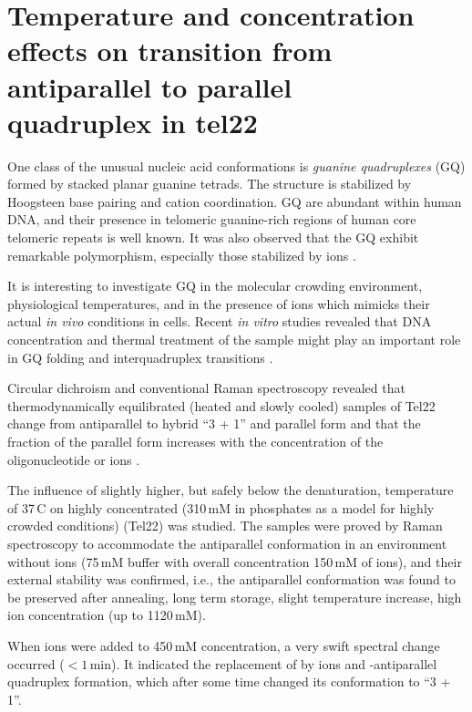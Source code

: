 \section[%
	Temperature and concentration effects on transition from antiparallel	to
	parallel quadruplex in tel22
]{%
	Temperature and concentration effects on transition from antiparallel to
	parallel\\quadruplex in tel22
}

One class of the unusual nucleic acid conformations is
\emph{guanine quadruplexes} (GQ)
formed by stacked planar guanine tetrads.
The structure is stabilized by Hoogsteen base pairing and cation coordination.
GQ are abundant within human DNA, and their presence in telomeric guanine-rich
regions of human core telomeric repeats  is well known.
It was also observed that the GQ exhibit remarkable polymorphism, especially
those stabilized by  ions
\parencite{Chaires2013}.

It is interesting to investigate GQ in the molecular crowding environment,
physiological temperatures, and in the presence of  ions which mimicks
their actual \emph{in vivo} conditions in cells.
Recent \emph{in vitro} studies revealed that DNA concentration and thermal
treatment
of the sample might play an important role in GQ folding and interquadruplex
transitions
\parencite{Palacky2013}.

Circular dichroism and conventional Raman spectroscopy revealed that
thermodynamically equilibrated (heated and slowly cooled) samples of Tel22
change from antiparallel to hybrid “3 + 1” and parallel form and that
the fraction of the parallel form increases with the concentration of the
oligonucleotide or  ions
\parencite{Palacky2013}.

The influence of slightly higher, but safely below the denaturation,
temperature of 37\,\textdegree{}C on highly concentrated (310\,mM
in phosphates as a model for highly crowded conditions) 
(Tel22) was studied.
The samples were proved by Raman spectroscopy to accommodate the antiparallel
conformation in an environment without  ions (75\,mM 
buffer with overall concentration 150\,mM of  ions), and their
external
stability was confirmed, i.e., the antiparallel conformation was found to be
preserved after annealing, long term storage, slight temperature increase, high
 ion concentration (up to 1120\,mM).

When  ions were added to 450\,mM concentration, a very swift spectral
change occurred ($< 1$\,min). It indicated the replacement of  by
 ions and -antiparallel quadruplex formation, which after
some time changed its conformation to “3 + 1”.


